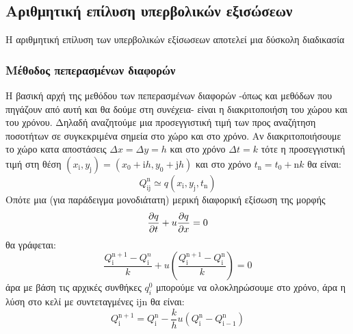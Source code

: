 


\subsection{Αριθμητική επίλυση υπερβολικών εξισώσεων}
Η αριθμητική επίλυση των υπερβολικών εξίσωσεων αποτελεί μια δύσκολη διαδικασία
\subsubsection{Μέθοδος πεπερασμένων διαφορών}
Η βασική αρχή της μεθόδου των πεπερασμένων διαφορών -όπως και μεθόδων που πηγάζουν από αυτή και θα δούμε στη συνέχεια- είναι η διακριτοποιήση του χώρου και του χρόνου. Δηλαδή αναζητούμε μια προσεγγιστική τιμή των προς αναζήτηση ποσοτήτων σε συγκεκριμένα σημεία στο χώρο και στο χρόνο. Αν διακριτοποιήσουμε το χώρο κατα αποστάσεις $\Delta x=\Delta y = h$ και στο χρόνο $\Delta t=k$ τότε η προσεγγιστική τιμή στη θέση $(x_\mathrm{i},y_\mathrm{j})=(x_0+\mathrm{i}h,y_0+\mathrm{j}h)$ και στο χρόνο $t_\mathrm{n}=t_0+\mathrm{n}k$ θα είναι:
\begin{equation}
Q_{\mathrm{ij}}^\mathrm{n }\simeq q(x_\mathrm{i},y_\mathrm{j},t_\mathrm{n})
\end{equation}
Οπότε μια (για παράδειγμα μονοδιάτατη) μερική διαφορική εξίσωση της μορφής
\begin{equation}
\pdv{q}{t}+u\pdv{q}{x}=0
\end{equation} 
θα γράφεται:
\begin{equation}
\frac{Q_\mathrm{i}^\mathrm{n+1}-Q_\mathrm{i}^n }{k} + u \left( \frac{Q_\mathrm{i}^\mathrm{n+1}-Q_\mathrm{i}^\mathrm{n} }{k}  \right) =0
\end{equation}
άρα με βάση τις αρχικές συνθήκες $q_i^0$ μπορούμε να ολοκληρώσουμε στο χρόνο, άρα η λύση στο κελί με συντεταγμένες $\mathrm{ijn}$ θα είναι:
\begin{equation}
Q_{\mathrm{i}}^\mathrm{n+1} = Q_{\mathrm{i}}^\mathrm{n} -\frac{k}{h} u \left( Q_\mathrm{i}^\mathrm{n} - Q_\mathrm{i-1}^\mathrm{n} \right)
\end{equation} 

